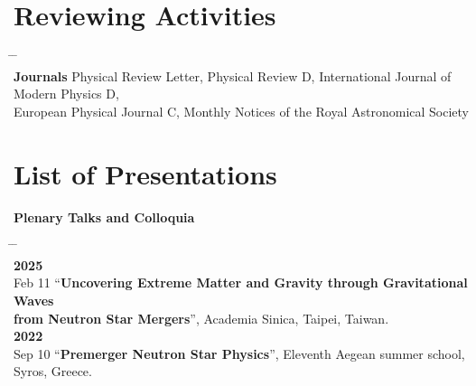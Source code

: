 \documentclass[10pt,floatfix,a4paper]{article}
\newcommand{\hk}[1]{\textcolor{UIUCOrange}{#1}}
\begin{document}
\section*{Reviewing Activities}
\begin{tabbing}
  \hspace*{5mm} \= \hspace*{2.3cm} \= \hspace*{10cm} \\[-3ex]
  \> \textbf{Journals} \> Physical Review Letter, Physical Review D, International Journal of Modern Physics D, \\
  \> \> European Physical Journal C, Monthly Notices of the Royal Astronomical Society
\end{tabbing}

\section*{List of Presentations}
\hspace*{4mm}
{\large \bf \hk{Plenary Talks and Colloquia}}
\begin{tabbing}
  \hspace*{5mm} \= \hspace*{2cm} \= \hspace*{10cm} \\[-3ex]
  \> \textbf{2025} \> \\[1ex]
  \> Feb 11 \> ``\textbf{Uncovering Extreme Matter and Gravity through Gravitational Waves}\\
  \>\> \textbf{from Neutron Star Mergers}'', Academia Sinica, Taipei, Taiwan. \\
  \> \textbf{2022} \> \\[1ex]
  \> Sep 10 \> ``\textbf{Premerger Neutron Star Physics}'', Eleventh Aegean summer school, Syros, Greece.
\end{tabbing}
\end{document}
